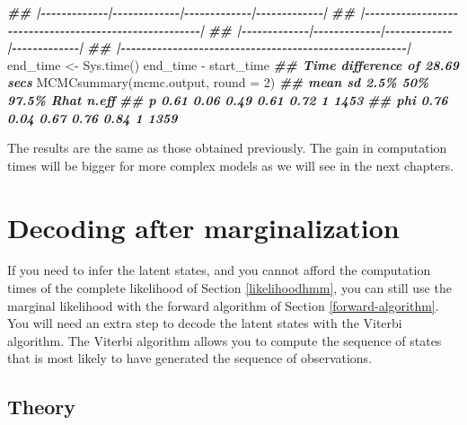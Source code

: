 \documentclass[
  12pt,
]{krantz}
\newenvironment{Shaded}{\begin{snugshade}}{\end{snugshade}}
\newcommand{\AttributeTok}[1]{\textcolor[rgb]{0.77,0.63,0.00}{#1}}
\newcommand{\DecValTok}[1]{\textcolor[rgb]{0.00,0.00,0.81}{#1}}
\newcommand{\DocumentationTok}[1]{\textcolor[rgb]{0.56,0.35,0.01}{\textbf{\textit{#1}}}}
\newcommand{\FunctionTok}[1]{\textcolor[rgb]{0.00,0.00,0.00}{#1}}
\newcommand{\NormalTok}[1]{#1}
\newcommand{\OtherTok}[1]{\textcolor[rgb]{0.56,0.35,0.01}{#1}}
\newcommand{\SpecialCharTok}[1]{\textcolor[rgb]{0.00,0.00,0.00}{#1}}
\begin{document}
\begin{Shaded}
\begin{Highlighting}[]
\DocumentationTok{\#\# |{-}{-}{-}{-}{-}{-}{-}{-}{-}{-}{-}{-}{-}|{-}{-}{-}{-}{-}{-}{-}{-}{-}{-}{-}{-}{-}|{-}{-}{-}{-}{-}{-}{-}{-}{-}{-}{-}{-}{-}|{-}{-}{-}{-}{-}{-}{-}{-}{-}{-}{-}{-}{-}|}
\DocumentationTok{\#\# |{-}{-}{-}{-}{-}{-}{-}{-}{-}{-}{-}{-}{-}{-}{-}{-}{-}{-}{-}{-}{-}{-}{-}{-}{-}{-}{-}{-}{-}{-}{-}{-}{-}{-}{-}{-}{-}{-}{-}{-}{-}{-}{-}{-}{-}{-}{-}{-}{-}{-}{-}{-}{-}{-}{-}|}
\DocumentationTok{\#\# |{-}{-}{-}{-}{-}{-}{-}{-}{-}{-}{-}{-}{-}|{-}{-}{-}{-}{-}{-}{-}{-}{-}{-}{-}{-}{-}|{-}{-}{-}{-}{-}{-}{-}{-}{-}{-}{-}{-}{-}|{-}{-}{-}{-}{-}{-}{-}{-}{-}{-}{-}{-}{-}|}
\DocumentationTok{\#\# |{-}{-}{-}{-}{-}{-}{-}{-}{-}{-}{-}{-}{-}{-}{-}{-}{-}{-}{-}{-}{-}{-}{-}{-}{-}{-}{-}{-}{-}{-}{-}{-}{-}{-}{-}{-}{-}{-}{-}{-}{-}{-}{-}{-}{-}{-}{-}{-}{-}{-}{-}{-}{-}{-}{-}|}
\NormalTok{end\_time }\OtherTok{\textless{}{-}} \FunctionTok{Sys.time}\NormalTok{()}
\NormalTok{end\_time }\SpecialCharTok{{-}}\NormalTok{ start\_time}
\DocumentationTok{\#\# Time difference of 28.69 secs}
\FunctionTok{MCMCsummary}\NormalTok{(mcmc.output, }\AttributeTok{round =} \DecValTok{2}\NormalTok{)}
\DocumentationTok{\#\#     mean   sd 2.5\%  50\% 97.5\% Rhat n.eff}
\DocumentationTok{\#\# p   0.61 0.06 0.49 0.61  0.72    1  1453}
\DocumentationTok{\#\# phi 0.76 0.04 0.67 0.76  0.84    1  1359}
\end{Highlighting}
\end{Shaded}

The results are the same as those obtained previously. The gain in computation times will be bigger for more complex models as we will see in the next chapters.

\hypertarget{decoding}{%
\section{Decoding after marginalization}\label{decoding}}

If you need to infer the latent states, and you cannot afford the computation times of the complete likelihood of Section \ref{likelihoodhmm}, you can still use the marginal likelihood with the forward algorithm of Section \ref{forward-algorithm}. You will need an extra step to decode the latent states with the Viterbi algorithm. The Viterbi algorithm allows you to compute the sequence of states that is most likely to have generated the sequence of observations.

\hypertarget{theory}{%
\subsection{Theory}\label{theory}}
\end{document}
